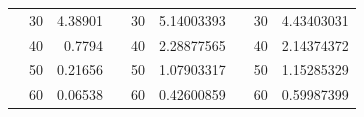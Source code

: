 \begin{table}[h]
\begin{tabular}{|ccrccrccr|}
\rowcolor[HTML]{DAE8FC} 
\multicolumn{1}{|c|}{\cellcolor[HTML]{FFFFC7}}                       & \multicolumn{1}{c|}{\cellcolor[HTML]{DAE8FC}30}        & \multicolumn{1}{r|}{\cellcolor[HTML]{DAE8FC}4.38901}    & \multicolumn{1}{c|}{\cellcolor[HTML]{FFFFC7}}                       & \multicolumn{1}{c|}{\cellcolor[HTML]{DAE8FC}30}        & \multicolumn{1}{r|}{\cellcolor[HTML]{DAE8FC}5.14003393} & \multicolumn{1}{c|}{\cellcolor[HTML]{FFFFC7}}                       & \multicolumn{1}{c|}{\cellcolor[HTML]{DAE8FC}30}        & 4.43403031                                              \\ \cline{2-3} \cline{5-6} \cline{8-9} 
\rowcolor[HTML]{DDFDFF} 
\multicolumn{1}{|c|}{\cellcolor[HTML]{FFFFC7}}                       & \multicolumn{1}{c|}{\cellcolor[HTML]{DDFDFF}40}        & \multicolumn{1}{r|}{\cellcolor[HTML]{DDFDFF}0.7794}     & \multicolumn{1}{c|}{\cellcolor[HTML]{FFFFC7}}                       & \multicolumn{1}{c|}{\cellcolor[HTML]{DDFDFF}40}        & \multicolumn{1}{r|}{\cellcolor[HTML]{DDFDFF}2.28877565} & \multicolumn{1}{c|}{\cellcolor[HTML]{FFFFC7}}                       & \multicolumn{1}{c|}{\cellcolor[HTML]{DDFDFF}40}        & 2.14374372                                              \\ \cline{2-3} \cline{5-6} \cline{8-9} 
\rowcolor[HTML]{DAE8FC} 
\multicolumn{1}{|c|}{\cellcolor[HTML]{FFFFC7}}                       & \multicolumn{1}{c|}{\cellcolor[HTML]{DAE8FC}50}        & \multicolumn{1}{r|}{\cellcolor[HTML]{DAE8FC}0.21656}    & \multicolumn{1}{c|}{\cellcolor[HTML]{FFFFC7}}                       & \multicolumn{1}{c|}{\cellcolor[HTML]{DAE8FC}50}        & \multicolumn{1}{r|}{\cellcolor[HTML]{DAE8FC}1.07903317} & \multicolumn{1}{c|}{\cellcolor[HTML]{FFFFC7}}                       & \multicolumn{1}{c|}{\cellcolor[HTML]{DAE8FC}50}        & 1.15285329                                              \\ \cline{2-3} \cline{5-6} \cline{8-9} 
\rowcolor[HTML]{DDFDFF} 
\multicolumn{1}{|c|}{\cellcolor[HTML]{FFFFC7}}                       & \multicolumn{1}{c|}{\cellcolor[HTML]{DDFDFF}60}        & \multicolumn{1}{r|}{\cellcolor[HTML]{DDFDFF}0.06538}    & \multicolumn{1}{c|}{\cellcolor[HTML]{FFFFC7}}                       & \multicolumn{1}{c|}{\cellcolor[HTML]{DDFDFF}60}        & \multicolumn{1}{r|}{\cellcolor[HTML]{DDFDFF}0.42600859} & \multicolumn{1}{c|}{\cellcolor[HTML]{FFFFC7}}                       & \multicolumn{1}{c|}{\cellcolor[HTML]{DDFDFF}60}        & 0.59987399                                              \\ \cline{2-3} \cline{5-6} \cline{8-9} 

\end{tabular}
\end{table}
